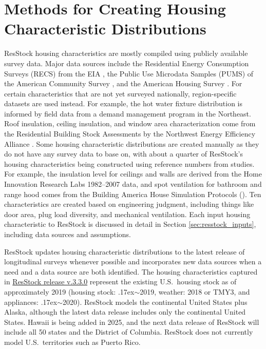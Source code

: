 \section{Methods for Creating Housing Characteristic Distributions}\label{hc_method}
ResStock housing characteristics are mostly compiled using publicly available survey data. Major data sources include the Residential Energy Consumption Surveys (RECS) from the EIA \citep{RECS2020}, the Public Use Microdata Samples (PUMS) of the American Community Survey \citep{PUMS}, and the American Housing Survey \citep{AHS}. For certain characteristics that are not yet surveyed nationally, region-specific datasets are used instead. For example, the hot water fixture distribution is informed by field data from a demand management program in the Northeast. Roof insulation, ceiling insulation, and window area characterization come from the Residential Building Stock Assessments by the Northwest Energy Efficiency Alliance \citep{RBSA}. Some housing characteristic distributions are created manually as they do not have any survey data to base on, with about a quarter of ResStock's housing characteristics being constructed using reference numbers from studies. For example, the insulation level for ceilings and walls are derived from the Home Innovation Research Labs 1982--2007 data, and spot ventilation for bathroom and range hood comes from the Building America House Simulation Protocols (\cite{Wilson2014}). Ten characteristics are created based on engineering judgment, including things like door area, plug load diversity, and mechanical ventilation. Each input housing characteristic to ResStock is discussed in detail in Section \ref{sec:resstock_inputs}, including data sources and assumptions. 

ResStock updates housing characteristic distributions to the latest release of longitudinal surveys whenever possible and incorporates new data sources when a need and a data source are both identified. The housing characteristics captured in \href{https://resstock.readthedocs.io/en/v3.3.0/}{ResStock release v.3.3.0} represent the existing U.S.~housing stock as of approximately 2019 (housing stock: {\raise.17ex\hbox{$\scriptstyle\sim$}}2019, weather: 2018 or TMY3, and appliances: {\raise.17ex\hbox{$\scriptstyle\sim$}}2020). ResStock models the continental United States plus Alaska, although the latest data release includes only the continental United States. Hawaii is being added in 2025, and the next data release of ResStock will include all 50 states and the District of Columbia. ResStock does not currently model U.S.~territories such as Puerto Rico.

